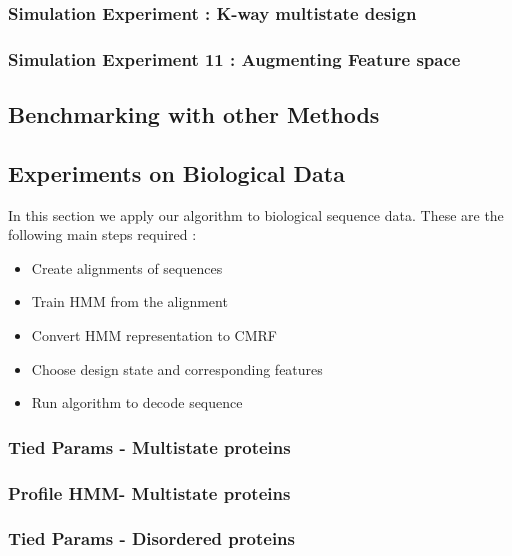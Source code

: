 \documentclass{article}
\begin{document}
\subsubsection{Simulation Experiment : K-way multistate design}

\subsubsection{Simulation Experiment 11 : Augmenting Feature space}

\subsection{Benchmarking with other Methods}

\subsection{Experiments on Biological Data}
In this section we apply our algorithm to biological sequence data. These are the following main steps required : 

\begin{itemize}
\item Create alignments of sequences 
\item Train HMM from the alignment
\item Convert HMM representation to CMRF
\item Choose design state and corresponding features
\item Run algorithm to decode sequence
\end{itemize}

\subsubsection{Tied Params - Multistate proteins}



\subsubsection{Profile HMM- Multistate proteins}

\subsubsection{Tied Params - Disordered proteins}









\end{document}
